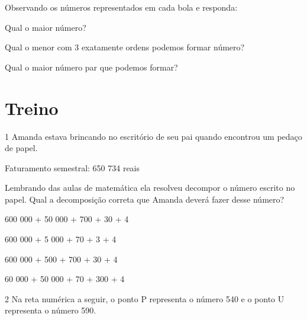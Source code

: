 Observando os números representados em cada bola e responda:

\begin{escolha}
\item  Qual o maior número?

\item  Qual o menor com 3 exatamente ordens podemos formar número?

\item  Qual o maior número par que podemos formar?

\end{escolha}


\section{Treino}

\num{1} Amanda estava brincando no escritório de seu pai quando encontrou um
pedaço de papel.


Faturamento semestral: 650 734 reais

Lembrando das aulas de matemática ela resolveu decompor o número escrito
no papel. Qual a decomposição correta que Amanda deverá fazer desse
número?

\begin{escolha}
\item
  600 000 + 50 000 + 700 + 30 + 4
\item
  600 000 + 5 000 + 70 + 3 + 4
\item
  600 000 + 500 + 700 + 30 + 4
\item
  60 000 + 50 000 + 70 + 300 + 4
\end{escolha}


\num{2} Na reta numérica a seguir, o ponto P representa o número 540 e o
ponto U representa o número 590.

